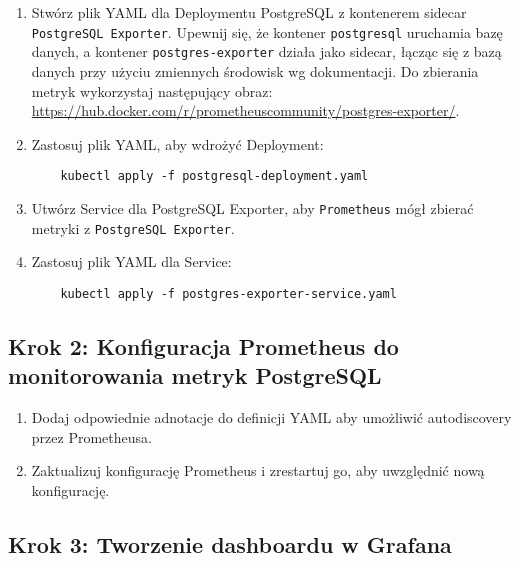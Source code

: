 \documentclass{article}
\begin{document}
\begin{enumerate}
    \item Stwórz plik YAML dla Deploymentu PostgreSQL z kontenerem sidecar \texttt{PostgreSQL Exporter}. Upewnij się, że kontener \texttt{postgresql} uruchamia bazę danych, a kontener \texttt{postgres-exporter} działa jako sidecar, łącząc się z bazą danych przy użyciu zmiennych środowisk wg dokumentacji. Do zbierania metryk wykorzystaj następujący obraz:\\
      \url{https://hub.docker.com/r/prometheuscommunity/postgres-exporter/}.
    \item Zastosuj plik YAML, aby wdrożyć Deployment:
    \begin{lstlisting}
    kubectl apply -f postgresql-deployment.yaml
    \end{lstlisting}

    \item Utwórz Service dla PostgreSQL Exporter, aby \texttt{Prometheus} mógł zbierać metryki z \texttt{PostgreSQL Exporter}.
    
    \item Zastosuj plik YAML dla Service:
    \begin{lstlisting}
    kubectl apply -f postgres-exporter-service.yaml
    \end{lstlisting}
\end{enumerate}

\subsection{Krok 2: Konfiguracja Prometheus do monitorowania metryk PostgreSQL}

\begin{enumerate}
  \item Dodaj odpowiednie adnotacje do definicji YAML aby umożliwić autodiscovery przez Prometheusa.
  \item Zaktualizuj konfigurację Prometheus i zrestartuj go, aby uwzględnić nową konfigurację.
\end{enumerate}

\subsection{Krok 3: Tworzenie dashboardu w Grafana}
\end{document}
